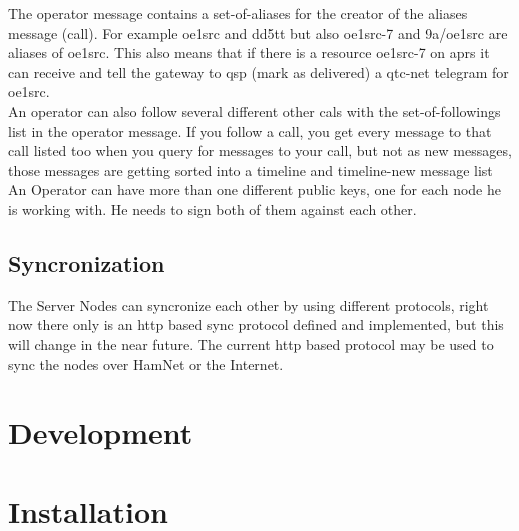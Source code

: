 The operator message contains a set-of-aliases for the creator of the aliases 
message (call). For example oe1src and dd5tt but also oe1src-7 and 9a/oe1src 
are aliases of oe1src. This also means that if there is a resource oe1src-7 
on aprs it can receive and tell the gateway to qsp (mark as delivered) a qtc-net 
telegram for oe1src. \\

An operator can also follow several different other cals with the set-of-followings
list in the operator message.  If you follow a call, you get every message to that call 
listed  too when you query for messages to your call, but not as new messages, those 
messages are getting sorted into a timeline and timeline-new message list\\

An Operator can have more than one different public keys, one for each 
node he is working with. He needs to sign both of them against each other. \\

\subsection{Syncronization}

The Server Nodes can syncronize each other by using different protocols, right
now there only is an http based sync protocol defined and implemented, but this
will change in the near future. The current http based protocol may be used to 
sync the nodes over HamNet or the Internet. 

\section{Development}


\section{Installation}


